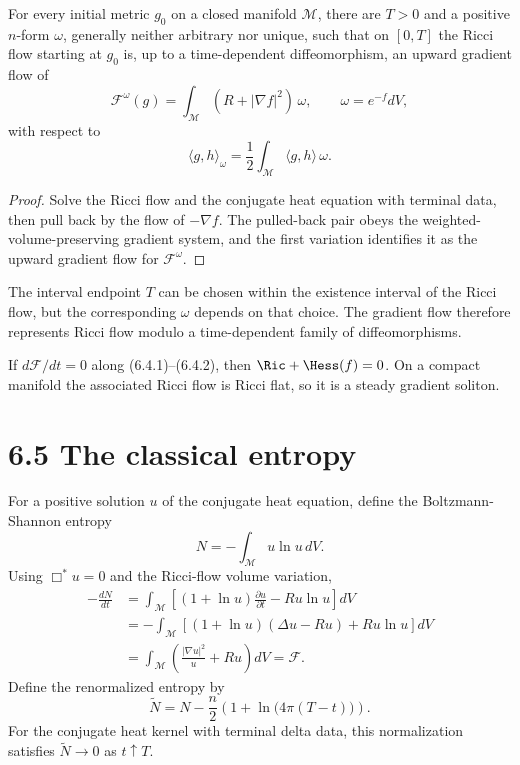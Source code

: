\begin{theorem}
\label{topping-gradient-flow-gradient-flow-formulation}

For every initial metric $g_0$ on a closed manifold $\mathcal M$, there are
$T>0$ and a positive $n$-form $\omega$, generally neither arbitrary nor
unique, such that on $[0,T]$ the Ricci flow starting at $g_0$ is, up to a
time-dependent diffeomorphism, an upward gradient flow of
\[
\mathcal F^\omega(g)=\int_{\mathcal M}(R+|\nabla f|^2)\,\omega,
\qquad \omega=e^{-f}dV,
\]
with respect to
\[
\langle g,h\rangle_\omega=\frac12\int_{\mathcal M}\langle g,h\rangle\,\omega.
\]
\end{theorem}

\begin{proof}
\sketch Solve the Ricci flow and the conjugate heat equation with terminal
data, then pull back by the flow of $-\nabla f$. The pulled-back pair obeys
the weighted-volume-preserving gradient system, and the first variation
identifies it as the upward gradient flow for $\mathcal F^\omega$.
\end{proof}

The interval endpoint $T$ can be chosen within the existence interval of the
Ricci flow, but the corresponding $\omega$ depends on that choice. The
gradient flow therefore represents Ricci flow modulo a time-dependent family
of diffeomorphisms.

\begin{remark}
\label{topping-gradient-flow-steady-soliton-criterion}
If $d\mathcal F/dt=0$ along (6.4.1)--(6.4.2), then
$\Ric+\Hess(f)=0$. On a compact manifold the associated Ricci flow is Ricci
flat, so it is a steady gradient soliton.
\end{remark}

\section{6.5 \quad The classical entropy}

For a positive solution $u$ of the conjugate heat equation, define the
Boltzmann-Shannon entropy
\[
N=-\int_{\mathcal M}u\ln u\,dV.
\]
Using $\Box^*u=0$ and the Ricci-flow volume variation,
\begin{align}
-\frac{dN}{dt}
&=\int_{\mathcal M}\left[(1+\ln u)\frac{\partial u}{\partial t}-Ru\ln u\right]dV \\
&=-\int_{\mathcal M}\left[(1+\ln u)(\Delta u-Ru)+Ru\ln u\right]dV \\
&=\int_{\mathcal M}\left(\frac{|\nabla u|^2}{u}+Ru\right)dV
=\mathcal F. \tag{6.5.1}
\end{align}
Define the renormalized entropy by
\begin{equation}
\widetilde N=N-\frac n2\left(1+\ln\bigl(4\pi(T-t)\bigr)\right). \tag{6.5.2}
\end{equation}
For the conjugate heat kernel with terminal delta data, this normalization
satisfies $\widetilde N\to0$ as $t\uparrow T$.


